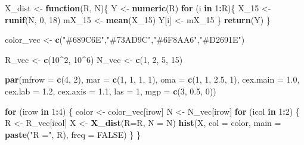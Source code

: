 \documentclass[
]{article}
\newenvironment{Shaded}{\begin{snugshade}}{\end{snugshade}}
\newcommand{\AttributeTok}[1]{\textcolor[rgb]{0.13,0.29,0.53}{#1}}
\newcommand{\ConstantTok}[1]{\textcolor[rgb]{0.56,0.35,0.01}{#1}}
\newcommand{\ControlFlowTok}[1]{\textcolor[rgb]{0.13,0.29,0.53}{\textbf{#1}}}
\newcommand{\DecValTok}[1]{\textcolor[rgb]{0.00,0.00,0.81}{#1}}
\newcommand{\FloatTok}[1]{\textcolor[rgb]{0.00,0.00,0.81}{#1}}
\newcommand{\FunctionTok}[1]{\textcolor[rgb]{0.13,0.29,0.53}{\textbf{#1}}}
\newcommand{\NormalTok}[1]{#1}
\newcommand{\OtherTok}[1]{\textcolor[rgb]{0.56,0.35,0.01}{#1}}
\newcommand{\SpecialCharTok}[1]{\textcolor[rgb]{0.81,0.36,0.00}{\textbf{#1}}}
\newcommand{\StringTok}[1]{\textcolor[rgb]{0.31,0.60,0.02}{#1}}
\begin{document}
\begin{Shaded}
\begin{Highlighting}[]
\NormalTok{X\_dist }\OtherTok{\textless{}{-}} \ControlFlowTok{function}\NormalTok{(R, N)\{}
\NormalTok{  Y }\OtherTok{\textless{}{-}} \FunctionTok{numeric}\NormalTok{(R)}
  \ControlFlowTok{for}\NormalTok{ (i }\ControlFlowTok{in} \DecValTok{1}\SpecialCharTok{:}\NormalTok{R)\{}
\NormalTok{    X\_15 }\OtherTok{\textless{}{-}} \FunctionTok{runif}\NormalTok{(N, }\DecValTok{0}\NormalTok{, }\DecValTok{18}\NormalTok{)}
\NormalTok{    mX\_15 }\OtherTok{\textless{}{-}} \FunctionTok{mean}\NormalTok{(X\_15)}
\NormalTok{    Y[i] }\OtherTok{\textless{}{-}}\NormalTok{ mX\_15}
\NormalTok{  \}}
  \FunctionTok{return}\NormalTok{(Y)}
\NormalTok{\}}

\NormalTok{color\_vec }\OtherTok{\textless{}{-}} \FunctionTok{c}\NormalTok{(}\StringTok{"\#689C6E"}\NormalTok{,}\StringTok{"\#73AD9C"}\NormalTok{,}\StringTok{"\#6F8AA6"}\NormalTok{,}\StringTok{"\#D2691E"}\NormalTok{)}

\NormalTok{R\_vec }\OtherTok{\textless{}{-}} \FunctionTok{c}\NormalTok{(}\DecValTok{10}\SpecialCharTok{\^{}}\DecValTok{2}\NormalTok{, }\DecValTok{10}\SpecialCharTok{\^{}}\DecValTok{6}\NormalTok{)}
\NormalTok{N\_vec }\OtherTok{\textless{}{-}} \FunctionTok{c}\NormalTok{(}\DecValTok{1}\NormalTok{, }\DecValTok{2}\NormalTok{, }\DecValTok{5}\NormalTok{, }\DecValTok{15}\NormalTok{)}

\FunctionTok{par}\NormalTok{(}\AttributeTok{mfrow =} \FunctionTok{c}\NormalTok{(}\DecValTok{4}\NormalTok{, }\DecValTok{2}\NormalTok{),}
    \AttributeTok{mar =} \FunctionTok{c}\NormalTok{(}\DecValTok{1}\NormalTok{, }\DecValTok{1}\NormalTok{, }\DecValTok{1}\NormalTok{, }\DecValTok{1}\NormalTok{),}
    \AttributeTok{oma =} \FunctionTok{c}\NormalTok{(}\DecValTok{1}\NormalTok{, }\DecValTok{1}\NormalTok{, }\FloatTok{2.5}\NormalTok{, }\DecValTok{1}\NormalTok{),}
    \AttributeTok{cex.main =} \FloatTok{1.0}\NormalTok{,}
    \AttributeTok{cex.lab =} \FloatTok{1.2}\NormalTok{,}
    \AttributeTok{cex.axis =} \FloatTok{1.1}\NormalTok{,}
    \AttributeTok{las =} \DecValTok{1}\NormalTok{,}
    \AttributeTok{mgp =} \FunctionTok{c}\NormalTok{(}\DecValTok{3}\NormalTok{, }\FloatTok{0.5}\NormalTok{, }\DecValTok{0}\NormalTok{))}

\ControlFlowTok{for}\NormalTok{ (irow }\ControlFlowTok{in} \DecValTok{1}\SpecialCharTok{:}\DecValTok{4}\NormalTok{) \{}
\NormalTok{  color }\OtherTok{\textless{}{-}}\NormalTok{ color\_vec[irow]}
\NormalTok{  N }\OtherTok{\textless{}{-}}\NormalTok{ N\_vec[irow]}
  \ControlFlowTok{for}\NormalTok{ (icol }\ControlFlowTok{in} \DecValTok{1}\SpecialCharTok{:}\DecValTok{2}\NormalTok{) \{}
\NormalTok{    R }\OtherTok{\textless{}{-}}\NormalTok{ R\_vec[icol]}
\NormalTok{    X }\OtherTok{\textless{}{-}} \FunctionTok{X\_dist}\NormalTok{(}\AttributeTok{R=}\NormalTok{R, }\AttributeTok{N =}\NormalTok{ N)}
    \FunctionTok{hist}\NormalTok{(X, }\AttributeTok{col =}\NormalTok{ color,}
         \AttributeTok{main =} \FunctionTok{paste}\NormalTok{(}\StringTok{"R ="}\NormalTok{, R), }\AttributeTok{freq =} \ConstantTok{FALSE}\NormalTok{)}
\NormalTok{  \}}
\NormalTok{\}}
\end{Highlighting}
\end{Shaded}
\end{document}
